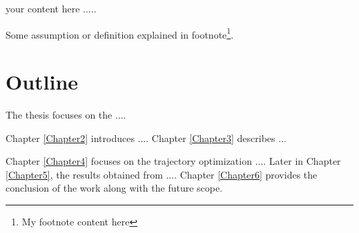 your content here .....\citep{greenwood1997classical}

Some assumption or definition explained in footnote\footnote{My footnote content here}.

\section{Outline}
The thesis focuses on the ....

Chapter \ref{Chapter2} introduces .... Chapter \ref{Chapter3} describes ...

Chapter \ref{Chapter4} focuses on the trajectory optimization .... Later in Chapter \ref{Chapter5}, the results obtained from .... Chapter \ref{Chapter6} provides the conclusion of the work along with the future scope.

